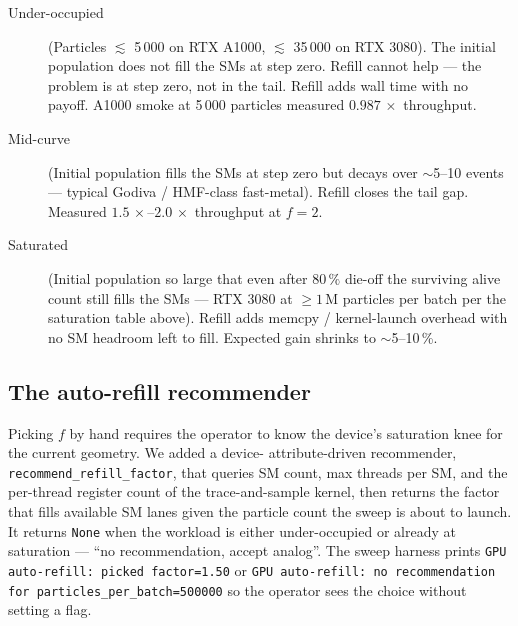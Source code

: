\begin{description}
    \item[Under-occupied] (Particles $\lesssim$ 5\,000 on RTX A1000,
        $\lesssim$ 35\,000 on RTX 3080). The initial population
        does not fill the SMs at step zero. Refill cannot help ---
        the problem is at step zero, not in the tail. Refill
        adds wall time with no payoff. A1000 smoke at 5\,000
        particles measured $0.987\,\times$ throughput.
    \item[Mid-curve] (Initial population fills the SMs at step
        zero but decays over $\sim$5--10 events --- typical Godiva
        / HMF-class fast-metal). Refill closes the tail gap.
        Measured $1.5\,\times$--$2.0\,\times$ throughput at
        $f=2$.
    \item[Saturated] (Initial population so large that even
        after $80\,\%$ die-off the surviving alive count still
        fills the SMs --- RTX 3080 at $\geq 1\,$M particles per
        batch per the saturation table above). Refill adds
        memcpy / kernel-launch overhead with no SM headroom left
        to fill. Expected gain shrinks to $\sim$5--10\,\%.
\end{description}

\subsection{The auto-refill recommender}

Picking $f$ by hand requires the operator to know the device's
saturation knee for the current geometry. We added a device-
attribute-driven recommender, \texttt{recommend\_refill\_factor},
that queries SM count, max threads per SM, and the per-thread
register count of the trace-and-sample kernel, then returns the
factor that fills available SM lanes given the particle count the
sweep is about to launch. It returns \texttt{None} when the
workload is either under-occupied or already at saturation ---
``no recommendation, accept analog''. The sweep harness prints
\texttt{GPU auto-refill: picked factor=1.50} or
\texttt{GPU auto-refill: no recommendation for
particles\_per\_batch=500000} so the operator sees the choice
without setting a flag.
